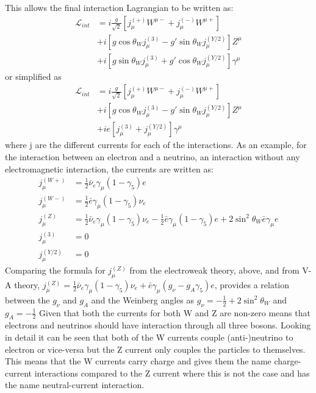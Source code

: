 This allows the final interaction Lagrangian to be written as:
\begin{align}
\mathcal{L}_{int}&=i\frac{g}{\sqrt{2}}[j_\mu^{(+)}W^{\mu-}+j_\mu^{(-)}W^{\mu+}]\\ \nonumber
&+i[g\cos\theta_Wj_\mu^{(3)}-g'\sin\theta_Wj_\mu^{(Y/2)}]Z^\mu\\ \nonumber
&+i[g\sin\theta_Wj_\mu^{(3)}+g'\cos\theta_Wj_\mu^{(Y/2)}]\gamma^\mu
\end{align}
or simplified as 
\begin{align}
\mathcal{L}_{int}&=i\frac{g}{\sqrt{2}}[j_\mu^{(+)}W^{\mu-}+j_\mu^{(-)}W^{\mu+}]\\ \nonumber
&+i[g\cos\theta_Wj_\mu^{(3)}-g'\sin\theta_Wj_\mu^{(Y/2)}]Z^\mu\\ \nonumber
&+ie[j_\mu^{(3)}+j_\mu^{(Y/2)}]\gamma^\mu
\end{align}
where j are the different currents for each of the interactions. As an example, for the interaction between an electron and a neutrino, an interaction without any electromagnetic interaction, the currents are written as:
\begin{align}
j_\mu^{(W+)}&=\frac{1}{2}\bar{\nu}_e\gamma_\mu(1-\gamma_5)e\\
j_\mu^{(W-)}&=\frac{1}{2}\bar{e}\gamma_\mu(1-\gamma_5)\nu_e\\
j_\mu^{(Z)}&=\frac{1}{2}\bar{\nu}_e\gamma_\mu(1-\gamma_5)\nu_e-\frac{1}{2}\bar{e}\gamma_\mu(1-\gamma_5)e+2\sin^2\theta_W\bar{e}\gamma_\mu e\\
j_\mu^{(3)}&=0\\
j_\mu^{(Y/2)}&=0
\end{align}
Comparing the formula for $j_\mu^{(Z)}$ from the electroweak theory, above, and from V-A theory, $j_\mu^{(Z)}=\frac{1}{2}\bar{\nu}_e\gamma_\mu(1-\gamma_5)\nu_e+\bar{e}\gamma_\mu(g_\nu-g_A\gamma_5)e$, provides a relation between the $g_\nu$ and $g_A$ and the Weinberg angles as $g_\nu=-\frac{1}{2}+2\sin^2\theta_W$ and $g_A = -\frac{1}{2}$ Given that both the currents for both W and Z are non-zero means that electrons and neutrinos should have interaction through all three bosons. Looking in detail it can be seen that both of the W currents couple (anti-)neutrino to electron or vice-versa but the Z current only couples the particles to themselves. This means that the W currents carry charge and gives them the name charge-current interactions compared to the Z current where this is not the case and has the name neutral-current interaction.


